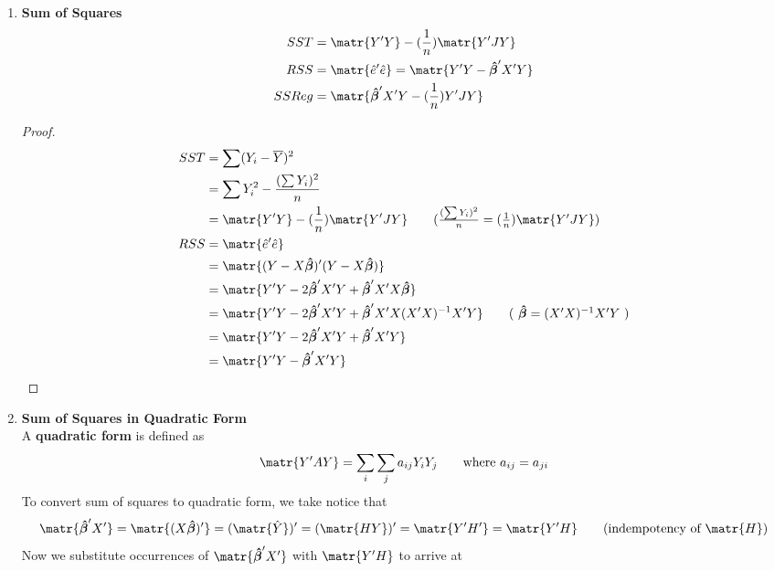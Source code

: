 \documentclass[11pt]{article}
\begin{document}
    
\begin{enumerate}
    \item \textbf{Sum of Squares} 
    \begin{align*}
        SST &= \matr{Y'Y} - (\frac{1}{n})\matr{Y'JY} \\
        RSS &= \matr{\hat{e}'\hat{e}} = \matr{ Y'Y - \boldsymbol{\hat{\beta}}' X'Y }  \\
        SSReg &= \matr{ \boldsymbol{\hat{\beta}}' X'Y - (\frac{1}{n})Y'JY }
    \end{align*}
    \begin{proof}
        \begin{align*}
            SST 
            &= \sum (Y_i - \overline{Y})^2 \\
            &= \sum Y_i^2 - \frac{(\sum Y_i)^2}{n}\\ 
            &= \matr{Y'Y} - (\frac{1}{n})\matr{Y'JY}\tag{$\frac{(\sum Y_i)^2}{n} = (\frac{1}{n})\matr{Y'JY}$} \\ 
            RSS 
            &= \matr{\hat{e}'\hat{e}}  \\
            &= \matr{(Y - X\boldsymbol{\hat{\beta}})'(Y - X\boldsymbol{\hat{\beta}})} \\
            &= \matr{Y'Y - 2\boldsymbol{\hat{\beta}}'X'Y + \boldsymbol{\hat{\beta}}'X'X\boldsymbol{\hat{\beta}}} \\
            &= \matr{Y'Y - 2\boldsymbol{\hat{\beta}}'X'Y + \boldsymbol{\hat{\beta}}'X'X (X'X)^{-1}X'Y} \tag{ $\boldsymbol{\hat{\beta}} = (X'X)^{-1}X'Y$ } \\
            &= \matr{Y'Y - 2\boldsymbol{\hat{\beta}}'X'Y + \boldsymbol{\hat{\beta}}'X'Y} \\
            &= \matr{ Y'Y - \boldsymbol{\hat{\beta}}' X'Y }
        \end{align*}
    \end{proof}
    \item \textbf{Sum of Squares in Quadratic Form}\\
    A \textbf{quadratic form} is defined as
    \[
        \matr{Y'AY} = \sum_i \sum_j a_{ij}Y_iY_j
        \quad \quad \text{where $a_{ij} = a_{ji}$}
    \] 
    To convert sum of squares to quadratic form, we take notice that 
    \[
        \matr{\boldsymbol{\hat{\beta}}'X'}
        = \matr{(X\boldsymbol{\hat{\beta}})'}
        = (\matr{\hat{Y}})'
        = (\matr{HY})'
        = \matr{Y'H'}
        = \matr{Y'H}
        \tag{indempotency of $\matr{H}$}
    \]
    Now we substitute occurrences of $\matr{\boldsymbol{\hat{\beta}}'X'}$ with $\matr{Y'H}$ to arrive at 

\end{enumerate}
\end{document}
